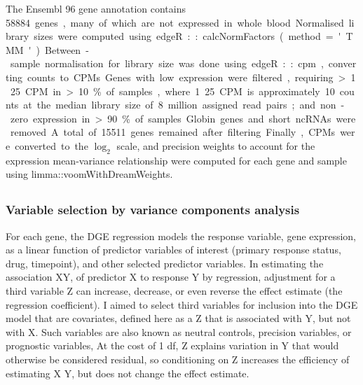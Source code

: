 \begin{outline}
The Ensembl 96 gene annotation contains \SI{58884} genes, many of which are not expressed in whole blood.
Normalised library sizes were computed using edgeR::calcNormFactors(method='TMM').
Between-sample normalisation for library size was done using edgeR::cpm, converting counts to \glspl{CPM}.
Genes with low expression were filtered,
requiring >1.25 CPM in >10\% of samples, where 1.25 CPM is approximately 10 counts at the median library size of 8 million assigned read pairs;
and non-zero expression in >90\% of samples.
Globin genes and short ncRNAs were removed.
A total of 15511 genes remained after filtering.
Finally, \glspl{CPM} were converted to the $\log_{2}$ scale, and precision weights to account for the expression mean-variance relationship were computed for each gene and sample using limma::voomWithDreamWeights.

\subsection{}

\subsubsection{Variable selection by variance components analysis}
\label{subsubsec:multiPANTS_var_selection}

For each gene, the \gls{DGE} regression models the response variable, gene expression, 
as a linear function of predictor variables of interest (primary response status, drug, timepoint),
and other selected predictor variables.
In estimating the association X\textrightarrow Y, of predictor X to response Y by regression, 
adjustment for a third variable Z can increase, decrease, or even reverse the effect estimate (the regression coefficient).
I aimed to select third variables for inclusion into the \gls{DGE} model that are covariates,
defined here as a Z that is associated with Y, but not with X.
Such variables are also known as neutral controls\autocite{cinelli2020CrashCourseGood}, precision variables, or prognostic variables,
At the cost of 1 \gls{df},
Z explains variation in Y that would otherwise be considered residual,
so conditioning on Z increases the efficiency of estimating X \textrightarrow Y, but does not change the effect estimate.


\end{outline}
